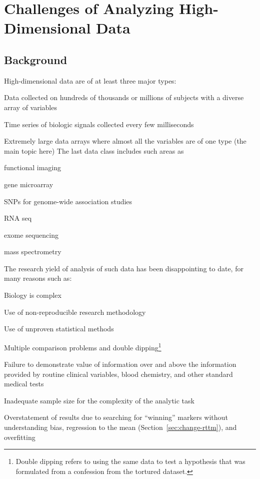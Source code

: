 

\chapter{Challenges of Analyzing High-Dimensional Data}

  
\section{Background}
High-dimensional data are of at least three major types:
\bi
\item Data collected on hundreds of thousands or millions of subjects
  with a diverse array of variables
\item Time series of biologic signals collected every few milliseconds
\item Extremely large data arrays where almost all the variables are
  of one type (the main topic here)
\ei
The last data class includes such areas as
\bi
\item functional imaging
\item gene microarray
\item SNPs for genome-wide association studies
\item RNA seq
\item exome sequencing
\item mass spectrometry
\ei

The research yield of analysis of such data has been disappointing to
date, for many reasons such as:
\bi
\item Biology is complex
\item Use of non-reproducible research methodology
\item Use of unproven statistical methods
\item Multiple comparison problems and double dipping\footnote{Double
    dipping refers to using the same data to test a hypothesis that
    was formulated from a confession from the tortured dataset.}
\item Failure to demonstrate value of information over and above the
  information provided by routine clinical variables, blood chemistry,
  and other standard medical tests
\item Inadequate sample size for the complexity of the analytic task
\item Overstatement of results due to searching for ``winning''
  markers without understanding bias, regression to the mean
  (Section~\ref{sec:change-rttm}), and overfitting
\ei

